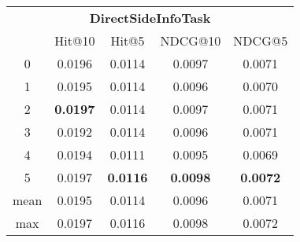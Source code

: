\documentclass{article}
\begin{document}
 

\begin{tabular}{c|cccc}

\multicolumn{5}{c}{\textbf{DirectSideInfoTask}} \\
\noalign{\smallskip}
\noalign{\smallskip}
\toprule
\multicolumn{1}{c}{Template ID} & \multicolumn{1}{|c}{Hit@10} & \multicolumn{1}{c}{Hit@5} & \multicolumn{1}{c}{NDCG@10} & \multicolumn{1}{c}{NDCG@5} \\
\midrule
0 & 0.0196 & 0.0114 & 0.0097 & 0.0071 \\
1 & 0.0195 & 0.0114 & 0.0096 & 0.0070 \\
2 & \textbf{0.0197} & 0.0114 & 0.0097 & 0.0071 \\
3 & 0.0192 & 0.0114 & 0.0096 & 0.0071 \\
4 & 0.0194 & 0.0111 & 0.0095 & 0.0069 \\
5 & 0.0197 & \textbf{0.0116} & \textbf{0.0098} & \textbf{0.0072} \\
\midrule
mean & 0.0195 & 0.0114 & 0.0096 & 0.0071 \\
max & 0.0197 & 0.0116 & 0.0098 & 0.0072 \\
\bottomrule

\end{tabular}
\end{document}
